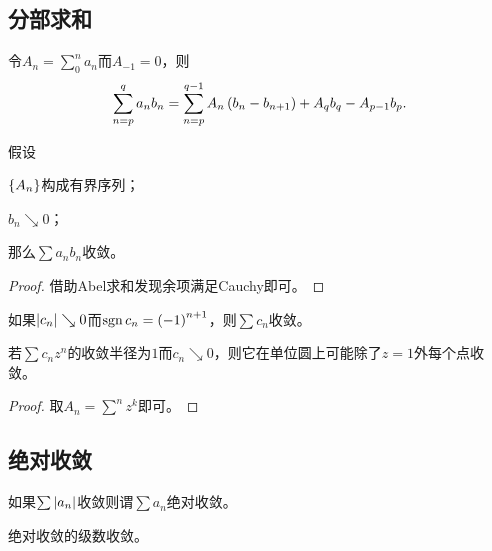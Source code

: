 \documentclass{ctexrep}
\begin{document}
  \subsection{分部求和}
  \begin{theorem}[Abel求和]
    令$A_n=\sum_0^n a_n$而$A_{-1}=0$，则
    \[ \sum_{n=p}^q a_n b_n = \sum_{n=p}^{q-1} A_n\left(b_n-b_{n+1}\right) + A_qb_q-A_{p-1}b_p. \]
  \end{theorem}
  \begin{theorem}
    假设
    \begin{cenum}
      \item $\left\{A_n\right\}$构成有界序列；
      \item $b_n\searrow 0$；
    \end{cenum}
    那么$\sum a_nb_n$收敛。
  \end{theorem}
  \begin{proof}
    借助Abel求和发现余项满足Cauchy即可。
  \end{proof}
  \begin{theorem}
    如果$\abs{c_n}\searrow 0$而$\mathrm{sgn}\, c_n=\left(-1\right)^{n+1}$，则$\sum c_n$收敛。
  \end{theorem}
  \begin{theorem}
    若$\sum c_nz^n$的收敛半径为$1$而$c_n\searrow 0$，则它在单位圆上可能除了$z=1$外每个点收敛。
  \end{theorem}
  \begin{proof}
    取$A_n=\sum^n z^k$即可。
  \end{proof}
  \subsection{绝对收敛}
  \begin{definition}
    如果$\sum \abs{a_n}$收敛则谓$\sum a_n$绝对收敛。
  \end{definition}
  \begin{theorem}
    绝对收敛的级数收敛。
  \end{theorem}
\end{document}
